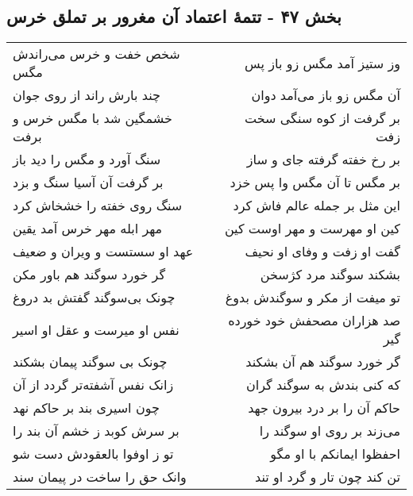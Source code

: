 \begin{center}
\section*{بخش ۴۷ - تتمهٔ اعتماد آن مغرور بر تملق خرس}
\label{sec:sh047}
\begin{longtable}{l p{0.5cm} r}
شخص خفت و خرس می‌راندش مگس
&&
وز ستیز آمد مگس زو باز پس
\\
چند بارش راند از روی جوان
&&
آن مگس زو باز می‌آمد دوان
\\
خشمگین شد با مگس خرس و برفت
&&
بر گرفت از کوه سنگی سخت زفت
\\
سنگ آورد و مگس را دید باز
&&
بر رخ خفته گرفته جای و ساز
\\
بر گرفت آن آسیا سنگ و بزد
&&
بر مگس تا آن مگس وا پس خزد
\\
سنگ روی خفته را خشخاش کرد
&&
این مثل بر جمله عالم فاش کرد
\\
مهر ابله مهر خرس آمد یقین
&&
کین او مهرست و مهر اوست کین
\\
عهد او سستست و ویران و ضعیف
&&
گفت او زفت و وفای او نحیف
\\
گر خورد سوگند هم باور مکن
&&
بشکند سوگند مرد کژسخن
\\
چونک بی‌سوگند گفتش بد دروغ
&&
تو میفت از مکر و سوگندش بدوغ
\\
نفس او میرست و عقل او اسیر
&&
صد هزاران مصحفش خود خورده گیر
\\
چونک بی سوگند پیمان بشکند
&&
گر خورد سوگند هم آن بشکند
\\
زانک نفس آشفته‌تر گردد از آن
&&
که کنی بندش به سوگند گران
\\
چون اسیری بند بر حاکم نهد
&&
حاکم آن را بر درد بیرون جهد
\\
بر سرش کوبد ز خشم آن بند را
&&
می‌زند بر روی او سوگند را
\\
تو ز اوفوا بالعقودش دست شو
&&
احفظوا ایمانکم با او مگو
\\
وانک حق را ساخت در پیمان سند
&&
تن کند چون تار و گرد او تند
\\
\end{longtable}
\end{center}

